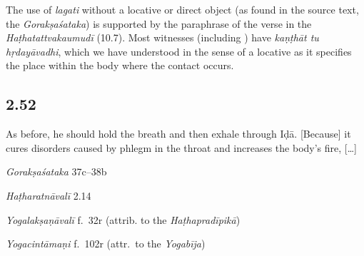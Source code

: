 \begin{ekdosis}
\begin{philcomm}[hp02_051]
The use of \emph{lagati} without a locative or direct object (as found in the source text, the \emph{Gorakṣaśataka}) is supported by the paraphrase of the verse in the \emph{Haṭhatattvakaumudī} (10.7). Most witnesses (including \textalpha) have \emph{kaṇṭhāt tu hṛdayāvadhi}, which we have understood in the sense of a locative as it specifies the place within the body where the contact occurs. 
\end{philcomm}

\subsection*{2.52}
\begin{translation}[hp02_052]
As before, he should hold the breath and then exhale through Iḍā. [Because] it cures disorders caused by phlegm in the throat and increases the body’s fire, [\ldots]
\end{translation}

\begin{sources}[hp02_052]
\emph{Gorakṣaśataka} 37c–38b
\begin{versinnote}
\end{versinnote}
\end{sources}

\begin{testimonia}[hp02_052]
\emph{Haṭharatnāvalī} 2.14

\begin{versinnote}
\end{versinnote}

\emph{Yogalakṣaṇāvalī} f.~32r (attrib. to the \emph{Haṭhapradīpikā})
\begin{versinnote}
\end{versinnote}

\emph{Yogacintāmaṇi} f.~102r (attr.~to the \emph{Yogabīja})

\begin{versinnote}
\end{versinnote}


\end{testimonia}
\end{ekdosis}
